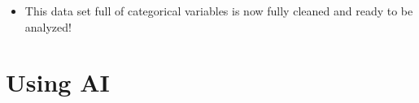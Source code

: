 \documentclass[
  letterpaper,
  DIV=11,
  numbers=noendperiod]{scrreprt}
\newenvironment{Shaded}{\begin{snugshade}}{\end{snugshade}}
\newcommand{\AttributeTok}[1]{\textcolor[rgb]{0.40,0.45,0.13}{#1}}
\newcommand{\CommentTok}[1]{\textcolor[rgb]{0.37,0.37,0.37}{#1}}
\newcommand{\FunctionTok}[1]{\textcolor[rgb]{0.28,0.35,0.67}{#1}}
\newcommand{\NormalTok}[1]{\textcolor[rgb]{0.00,0.23,0.31}{#1}}
\newcommand{\OtherTok}[1]{\textcolor[rgb]{0.00,0.23,0.31}{#1}}
\newcommand{\StringTok}[1]{\textcolor[rgb]{0.13,0.47,0.30}{#1}}
\begin{document}
\begin{itemize}
\begin{Shaded}
\begin{Highlighting}[]
        \StringTok{\textasciigrave{}}\AttributeTok{6}\StringTok{\textasciigrave{}} \OtherTok{=} \StringTok{"Other"}\NormalTok{, }\StringTok{\textasciigrave{}}\AttributeTok{7}\StringTok{\textasciigrave{}} \OtherTok{=} \StringTok{"Other"}\NormalTok{, }\StringTok{\textasciigrave{}}\AttributeTok{8}\StringTok{\textasciigrave{}} \OtherTok{=} \StringTok{"Other"}\NormalTok{, }\StringTok{\textasciigrave{}}\AttributeTok{9}\StringTok{\textasciigrave{}} \OtherTok{=} \StringTok{"Other"}\NormalTok{))}
\CommentTok{\# print a summary}
\FunctionTok{summary}\NormalTok{(brfss\_small)}
\end{Highlighting}
\end{Shaded}

\begin{verbatim}
                  TRNSGNDR   X_AGEG5YR                     X_RACE   
 Male to female       : 77   40-44:27   White                 :152  
 Female to male       :113   45-49:27   Black                 : 31  
 Gender non-conforming: 32   50-54:32   Native American       :  4  
 Not transgender      :  0   55-59:44   Asian/Pacific Islander:  6  
 Not sure             :  0   60-64:44   Other                 : 29  
 Refused              :  0   65-69:24                               
                             70-74:24                               
                        X_INCOMG                                     X_EDUCAG 
 Less than 15,000           :46   Did not graduate high school           :24  
 15,000 to less than 25,000 :44   Graduated high school                  :86  
 25,000 to less than 35,000 :19   Attended college/technical school      :68  
 35,000 to less than 50,000 :26   Graduated from college/technical school:44  
 50,000 or more             :65                                               
 Don't know/not sure/missing:22                                               

 HLTHPLN1  HADMAM 
 Yes:198   1:198  
 No : 24   2: 22  
           9:  2  



\end{verbatim}
\item
  This data set full of categorical variables is now fully cleaned and
  ready to be analyzed!
\end{itemize}


\chapter{Using AI}\label{using-ai-1}
\end{document}

